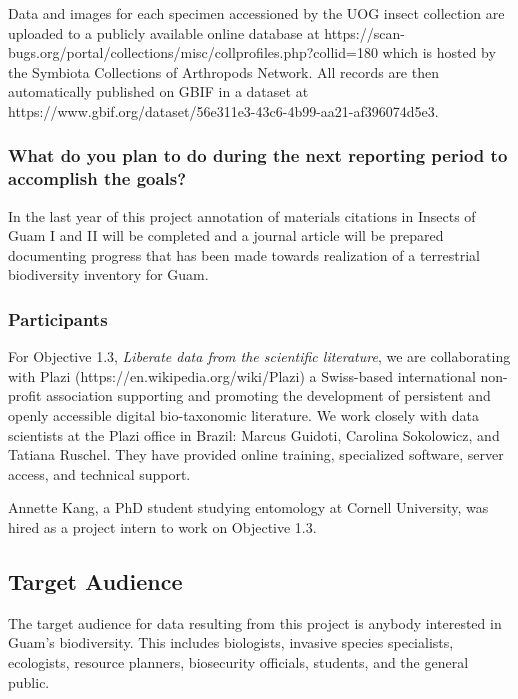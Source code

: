 \documentclass[
]{article}
\begin{document}
Data and images for each specimen accessioned by the UOG insect
collection are uploaded to a publicly available online database at
https://scan-bugs.org/portal/collections/misc/collprofiles.php?collid=180
which is hosted by the Symbiota Collections of Arthropods Network. All
records are then automatically published on GBIF in a dataset at
https://www.gbif.org/dataset/56e311e3-43c6-4b99-aa21-af396074d5e3.

\hypertarget{what-do-you-plan-to-do-during-the-next-reporting-period-to-accomplish-the-goals}{%
\subsubsection{What do you plan to do during the next reporting period
to accomplish the
goals?}\label{what-do-you-plan-to-do-during-the-next-reporting-period-to-accomplish-the-goals}}

In the last year of this project annotation of materials citations in
Insects of Guam I and II will be completed and a journal article will be
prepared documenting progress that has been made towards realization of
a terrestrial biodiversity inventory for Guam.

\hypertarget{participants}{%
\subsubsection{Participants}\label{participants}}

For Objective 1.3, \emph{Liberate data from the scientific literature},
we are collaborating with Plazi (https://en.wikipedia.org/wiki/Plazi) a
Swiss-based international non-profit association supporting and
promoting the development of persistent and openly accessible digital
bio-taxonomic literature. We work closely with data scientists at the
Plazi office in Brazil: Marcus Guidoti, Carolina Sokolowicz, and Tatiana
Ruschel. They have provided online training, specialized software,
server access, and technical support.

Annette Kang, a PhD student studying entomology at Cornell University,
was hired as a project intern to work on Objective 1.3.

\hypertarget{target-audience}{%
\subsection{Target Audience}\label{target-audience}}

The target audience for data resulting from this project is anybody
interested in Guam's biodiversity. This includes biologists, invasive
species specialists, ecologists, resource planners, biosecurity
officials, students, and the general public.
\end{document}
